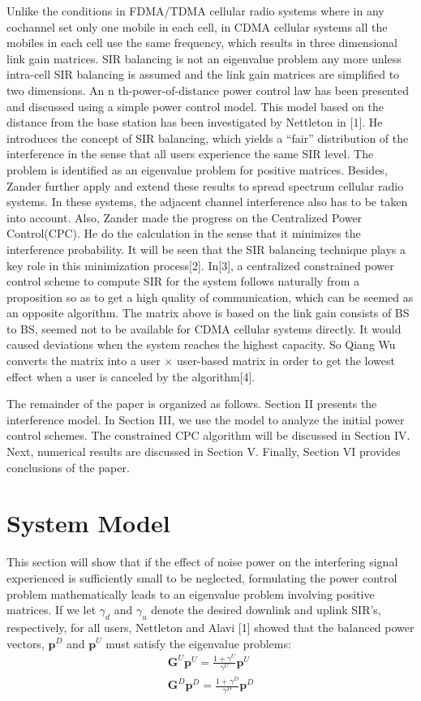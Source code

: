 \documentclass[conference]{IEEEtran}
\begin{document}
Unlike the conditions in FDMA/TDMA cellular radio systems where in any cochannel set only one mobile in each cell, in CDMA cellular systems all the mobiles in each cell use the same frequency, which results in three dimensional link gain matrices. SIR balancing is not an eigenvalue problem any more unless intra-cell SIR balancing is assumed and the link gain matrices are simplified to two dimensions\cite{IEEEhowto:kopka}. An n th-power-of-distance power control law has been presented and discussed using a simple power control model. This model based on the distance from the base station has been investigated by Nettleton in [1]. He introduces the concept of SIR balancing, which yields a “fair” distribution of the interference in the sense that all users experience the same SIR level. The problem is identified as an eigenvalue problem for positive matrices. Besides, Zander further apply and extend these results to spread spectrum cellular radio systems. In these systems, the adjacent channel interference also has to be taken into account. Also, Zander made the progress on the Centralized Power Control(CPC). He do the calculation in the sense that it minimizes the interference probability. It will be seen that the SIR balancing technique plays a key role in this minimization process[2]. In[3], a centralized constrained power control scheme to compute SIR for the system follows naturally from a proposition so as to get a high quality of communication, which can be seemed as an opposite algorithm. The matrix above is based on the link gain consists of BS to BS, seemed not to be available for CDMA cellular systems directly. It would caused deviations when the system reaches the highest capacity. So Qiang Wu converts the matrix into a user $\times$ user-based matrix in order to get the lowest effect when a user is canceled by the algorithm[4].

The remainder of the paper is organized as follows. Section II presents the interference model. In Section III, we use the model to analyze the initial power control schemes. The constrained CPC algorithm will be discussed in Section IV. Next, numerical results are discussed in Section V. Finally, Section VI provides conclusions of the paper.




\section{System Model}
This section will show that if the effect of noise power on the interfering signal experienced is sufficiently small to be neglected, formulating the power control problem mathematically leads to an eigenvalue problem involving positive matrices. If we let $\gamma_d$ and $\gamma_u$ denote the desired downlink and uplink SIR’s, respectively, for all users, Nettleton and Alavi [1] showed that the balanced power vectors, $\bm{p}^D$ and $\bm{p}^U$ must satisfy the eigenvalue problems:
\begin{align}
\bm{G}^U \bm{p}^U = \frac{1+\gamma^U}{\gamma^U}\bm{p}^U \\
 \bm{G}^D \bm{p}^D = \frac{1+\gamma^D}{\gamma^D}\bm{p}^D
\end{align}
\end{document}
